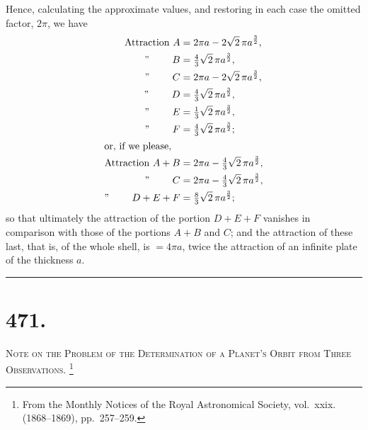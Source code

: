 \documentclass[11pt,a4paper]{article}
\theoremstyle{definition}
\begin{document}
\newpage
\noindent
Hence, calculating the approximate values, and restoring in each case the omitted
factor, $2\pi$, we have
\begin{align*}
\text{Attraction } A &= 2\pi a - 2\sqrt{2}\,\pi a^{\frac32}, \\
\text{'' } \qquad B &= \tfrac43\sqrt{2}\,\pi a^{\frac32}, \\
\text{'' } \qquad C &= 2\pi a - 2\sqrt{2}\,\pi a^{\frac32}, \\
\text{'' } \qquad D &= \tfrac43\sqrt{2}\,\pi a^{\frac32}, \\
\text{'' } \qquad E &= \tfrac13\sqrt{2}\,\pi a^{\frac32}, \\
\text{'' } \qquad F &= \tfrac43\sqrt{2}\,\pi a^{\frac32}; \\
\intertext{or, if we please,}
\text{Attraction } A+B &= 2\pi a - \tfrac43\sqrt{2}\,\pi a^{\frac32}, \\
\text{'' } \qquad C &= 2\pi a - \tfrac43\sqrt{2}\,\pi a^{\frac32}, \\
\text{'' } \qquad D+E+F &= \tfrac83\sqrt{2}\,\pi a^{\frac32};
\end{align*}
so that ultimately the attraction of the portion $D+E+F$ vanishes in comparison with
those of the portions $A+B$ and $C$; and the attraction of these last, that is, of the
whole shell, is $=4\pi a$, twice the attraction of an infinite plate of the thickness $a$.

\hfill\rule{1.5cm}{0.4pt}

\newpage

\section*{471.}
\markboth{NOTE ON THE PROBLEM OF THE DETERMINATION OF A PLANET'S ORBIT.}{471]}

\noindent\textsc{Note on the Problem of the Determination of a Planet's Orbit from Three
Observations.}%
\footnote{From the Monthly Notices of the Royal Astronomical Society, vol.~xxix. (1868--1869), pp.~257--259.}
\end{document}
